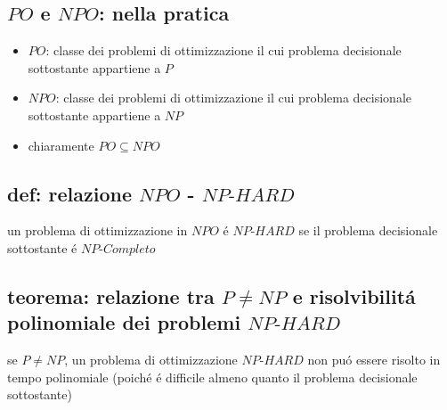 
\subsection*{$PO$ e $NPO$: nella pratica}
\begin{flushleft}
	\begin{itemize}
		\item $PO$: classe dei problemi di ottimizzazione il cui problema decisionale sottostante appartiene a $P$
		\item $NPO$: classe dei problemi di ottimizzazione il cui problema decisionale sottostante appartiene a $NP$
		\item chiaramente $PO\subseteq NPO$
	\end{itemize}
\end{flushleft}


\subsection*{def: relazione $NPO$ - $NP\text{-}HARD$}
\begin{flushleft}
	un problema di ottimizzazione in $NPO$ \'e $NP\text{-}HARD$ se il problema decisionale sottostante \'e $NP\text{-}Completo$
\end{flushleft}


\subsection*{teorema: relazione tra $P\neq NP$ e risolvibilit\'a polinomiale dei problemi $NP\text{-}HARD$}
\begin{flushleft}
	se $P\neq NP$, un problema di ottimizzazione $NP\text{-}HARD$ non pu\'o essere risolto in tempo polinomiale (poich\'e \'e difficile almeno quanto il problema decisionale sottostante)
\end{flushleft}


